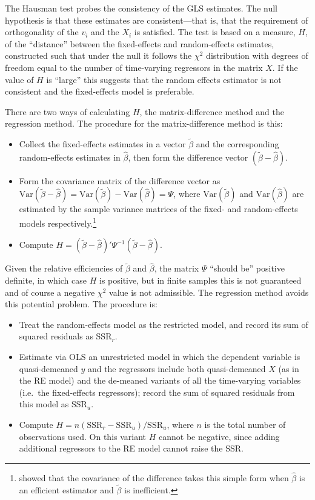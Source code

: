 The Hausman test probes the consistency of the GLS estimates.  The
null hypothesis is that these estimates are consistent---that is,
that the requirement of orthogonality of the $v_i$ and the $X_i$ is
satisfied.  The test is based on a measure, $H$, of the ``distance''
between the fixed-effects and random-effects estimates, constructed
such that under the null it follows the $\chi^2$ distribution with
degrees of freedom equal to the number of time-varying regressors in
the matrix $X$.  If the value of $H$ is ``large'' this suggests that
the random effects estimator is not consistent and the fixed-effects
model is preferable.

There are two ways of calculating $H$, the matrix-difference method
and the regression method.  The procedure for the matrix-difference
method is this:
\begin{itemize}
\item Collect the fixed-effects estimates in a vector
  $\tilde{\beta}$ and the corresponding random-effects estimates in
  $\hat{\beta}$, then form the difference vector $(\tilde{\beta} -
  \hat{\beta})$. 
\item Form the covariance matrix of the difference vector as
  $\mbox{Var}(\tilde{\beta} - \hat{\beta}) = \mbox{Var}(\tilde{\beta})
  - \mbox{Var}(\hat{\beta}) = \Psi$, where $\mbox{Var}(\tilde{\beta})$
  and $\mbox{Var}(\hat{\beta})$ are estimated by the sample variance
  matrices of the fixed- and random-effects models
  respectively.\footnote{\cite{hausman78} showed that the covariance of
    the difference takes this simple form when $\hat{\beta}$ is an
    efficient estimator and $\tilde{\beta}$ is inefficient.}
\item Compute $H = \left(\tilde{\beta} - \hat{\beta}\right)' \Psi^{-1}
   \left(\tilde{\beta} - \hat{\beta}\right)$.
\end{itemize}

Given the relative efficiencies of $\tilde{\beta}$ and $\hat{\beta}$,
the matrix $\Psi$ ``should be'' positive definite, in which case $H$ is
positive, but in finite samples this is not guaranteed and of course
a negative $\chi^2$ value is not admissible.  The regression method
avoids this potential problem.  The procedure is:
\begin{itemize}
\item Treat the random-effects model as the restricted model, and
  record its sum of squared residuals as SSR$_r$.
\item Estimate via OLS an unrestricted model in which the dependent
  variable is quasi-demeaned $y$ and the regressors include both
  quasi-demeaned $X$ (as in the RE model) and the de-meaned variants
  of all the time-varying variables (i.e.\ the fixed-effects
  regressors); record the sum of squared residuals from this model
  as SSR$_u$.
\item Compute $H = n \left(\mbox{SSR}_r - \mbox{SSR}_u\right) /
  \mbox{SSR}_u$, where $n$ is the total number of observations used.
  On this variant $H$ cannot be negative, since adding additional
  regressors to the RE model cannot raise the SSR.
\end{itemize}

